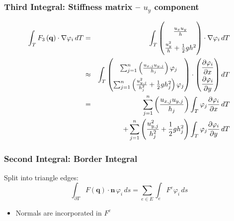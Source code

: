 \documentclass{beamer}
\newcommand{\pd}[2]{\dfrac{\partial #1}{\partial #2}}
\renewcommand{\phi}{\varphi}
\begin{document}
\begin{frame}
  \frametitle{Third Integral: Stiffness matrix -- $u_y$ component}
  \begin{eqnarray*}
    \int_T F_3\left(\mathbf{q}\right) \cdot \nabla \phi_i \, dT & = &
    \int_T
    \begin{pmatrix}
      \frac{u_x u_y}{h} \\ \frac{u_y^2}{h} + \frac{1}{2} g h^2 
    \end{pmatrix}
    \cdot \nabla \phi_i \, dT \\
    & \approx & \int_T 
    \begin{pmatrix}
      \sum_{j=1}^n \left(\frac{u_{x,j} u_{y,j}}{h_j}\right) \phi_j \\
      \sum_{j=1}^n \left(\frac{u_{y,j}^2}{h_j^2} + \frac{1}{2} g h_j^2\right) \phi_j \\
    \end{pmatrix}
    \cdot 
    {
      \renewcommand{\arraystretch}{2}
      \begin{pmatrix}
        \pd{\phi_i}{x} \\
        \pd{\phi_i}{y} 
      \end{pmatrix} dT 
    } \\
    & = & \sum_{j=1}^n \left(\frac{u_{x,j} u_{y,j}}{h_j}\right) \int_T \phi_j \pd{\phi_i}{x} \, dT \\
    & {} & + \sum_{j=1}^n \left(\frac{u_{y,j}^2}{h_j^2} + \frac{1}{2} g h_j^2\right) \int_T \phi_j \pd{\phi_i}{y} \, dT
  \end{eqnarray*}
\end{frame}

\begin{frame}
  \frametitle{Second Integral: Border Integral}
  Split into triangle edges:
  \begin{equation}
    \label{eq:border-integral-sum}
    \int_{\partial T} F(\mathbf{q}) \cdot \mathbf{n} \, \phi_i \, ds = \sum_{e \in E} \int_{e} F^e \phi_i \, ds
  \end{equation}
  \begin{itemize}
  \item Normals are incorporated in $F^e$
  \end{itemize}
\end{frame}
\end{document}
